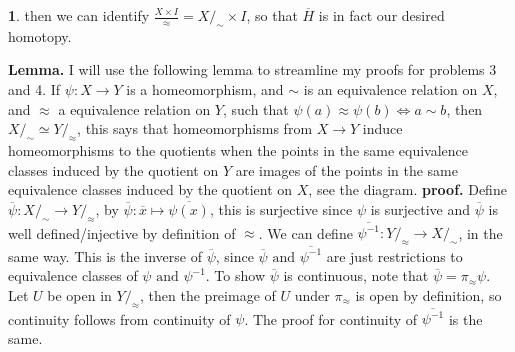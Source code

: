 \documentclass[10.5pt]{article}
\theoremstyle{definition}
\newtheorem{pb}{}
\newcommand{\tand}{\text{ and }}
\newcommand{\ism}{\simeq}
\begin{document}
\begin{pb}

        then we can identify \(\frac{X \times I}{\approx} = X/_\sim \times I\), so that \(\overline{H}\) is in fact our desired homotopy.
    \end{pb}

    \textbf{Lemma.} I will use the following lemma to streamline my proofs for problems 3 and 4. \newline
    If \(\psi: X \to Y\) is a homeomorphism, and \(\sim\) is an equivalence relation on \(X\), and \(\approx\) a equivalence relation on \(Y\), such that
    \(\psi(a) \approx \psi(b) \iff a \sim b\), then \(X/_\sim \ism Y/_\approx\), this says that homeomorphisms from \(X \to Y\) induce homeomorphisms to the quotients when the points in the same equivalence
    classes induced by the quotient on \(Y\) are images of the points in the same equivalence classes induced by the quotient on \(X\), see the diagram.
    \textbf{proof.} Define \(\overline{\psi}: X/_\sim \to Y/_\approx\), by \(\overline{\psi}: \overline{x} \mapsto \overline{\psi(x)}\), this is surjective since \(\psi\) is surjective and \(\overline{\psi}\) is
    well defined/injective by definition of \(\approx\). We can define \(\overline{\psi^{-1}}: Y/_\approx \to X/_\sim\), in the same way. This is the inverse of \(\overline{\psi}\), since
    \(\overline{\psi} \tand \overline{\psi^{-1}}\) are just restrictions to equivalence classes of \(\psi \tand \psi^{-1}\). To show \(\overline{\psi}\) is continuous, note that
    \(\overline{\psi} = \pi_\approx \psi\). Let \(U\) be open in \(Y/_\approx\), then the preimage of \(U\) under \(\pi_\approx \) is open by definition, so continuity follows from continuity of \(\psi\).
    The proof for continuity of \(\overline{\psi^{-1}}\) is the same.
\end{document}
